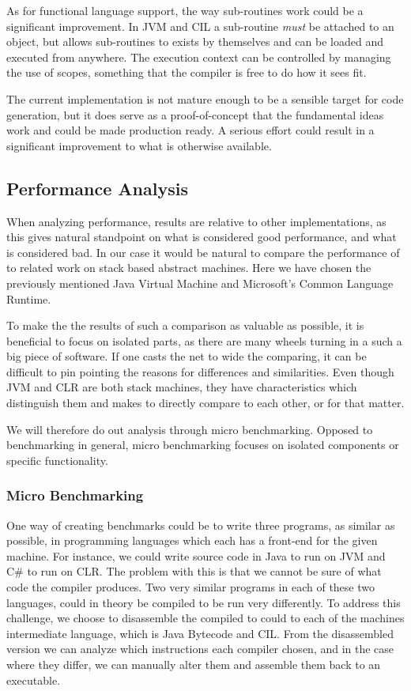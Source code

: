 As for functional language support, the way sub-routines work could be a
significant improvement. In JVM and CIL a sub-routine \emph{must} be attached to
an object, but \thename{} allows sub-routines to exists by themselves and can be
loaded and executed from anywhere. The execution context can be controlled by
managing the use of scopes, something that the compiler is free to do how it
sees fit.

The current implementation is not mature enough to be a sensible target for code
generation, but it does serve as a proof-of-concept that the fundamental ideas
work and could be made production ready. A serious effort could result in a
significant improvement to what is otherwise available.

\subsection{Performance Analysis}

When analyzing performance, results are relative to other implementations, as
this gives natural standpoint on what is considered good performance, and what
is considered bad. In our case it would be natural to compare the performance of
\thename{} to related work on stack based abstract machines. Here we have chosen
the previously mentioned Java Virtual Machine and Microsoft's Common Language
Runtime.

To make the the results of such a comparison as valuable as possible, it is
beneficial to focus on isolated parts, as there are many wheels turning in a
such a big piece of software. If one casts the net to wide the comparing, it can
be difficult to pin pointing the reasons for differences and similarities. Even
though JVM and CLR are both stack machines, they have characteristics which
distinguish them and makes to directly compare to each other, or \thename{} for
that matter.

We will therefore do out analysis through micro benchmarking. Opposed to
benchmarking in general, micro benchmarking focuses on isolated components or
specific functionality.

\subsubsection{Micro Benchmarking}

One way of creating benchmarks could be to write three programs, as similar as
possible, in programming languages which each has a front-end for the given
machine. For instance, we could write source code in Java to run on JVM and C\#
to run on CLR. The problem with this is that we cannot be sure of what code
the compiler produces. Two very similar programs in each of these two languages,
could in theory be compiled to be run very differently. To address this
challenge, we choose to disassemble the compiled to could to each of the
machines intermediate language, which is Java Bytecode and CIL. From the
disassembled version we can analyze which instructions each compiler chosen, and
in the case where they differ, we can manually alter them and assemble them back
to an executable.

